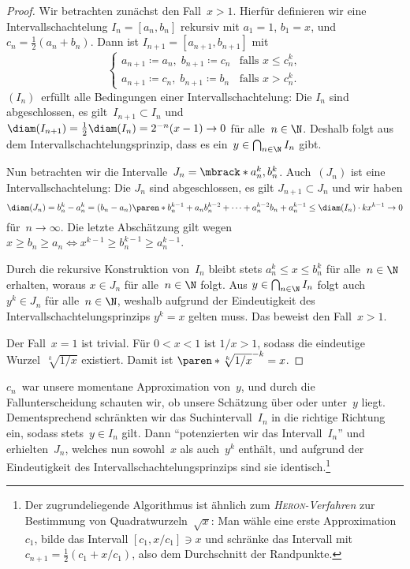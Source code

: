 \documentclass[a4paper]{article}
\begin{document}
\begin{proof}
    Wir betrachten zunächst den Fall~$x > 1$. Hierfür definieren wir eine Intervallschachtelung $I_n = [a_n, b_n]$ rekursiv mit $a_1 = 1$, $b_1 = x$, und $c_n = \frac{1}{2}(a_n + b_n)$. Dann ist $I_{n+1} = [a_{n+1}, b_{n+1}]$ mit
    \begin{equation*}
        \begin{cases}
            a_{n+1} \coloneqq a_n,\; b_{n+1} \coloneqq c_n & \text{falls } x \leq c_n^k, \\
            a_{n+1} \coloneqq c_n,\; b_{n+1} \coloneqq b_n & \text{falls } x > c_n^k.
        \end{cases}
    \end{equation*}
    $(I_n)$~erfüllt alle Bedingungen einer Intervallschachtelung: Die $I_n$ sind abgeschlossen, es gilt~$I_{n+1} \subset I_n$ und $\diam(I_{n+1}) = \frac{1}{2} \diam(I_n) = 2^{-n} (x-1) \to 0$ für alle~$n \in \N$. Deshalb folgt aus dem Intervallschachtelungsprinzip, dass es ein~$y \in \bigcap_{n\in\N} I_n$ gibt.

    Nun betrachten wir die Intervalle~$J_n = \mbrack*{a_n^k, b_n^k}$. Auch~$(J_n)$ ist eine Intervallschachtelung: Die $J_n$ sind abgeschlossen, es gilt $J_{n+1} \subset J_n$ und wir haben
    \begin{equation*}
        \diam(J_n) = b_n^k - a_n^k = (b_n - a_n) \paren*{b_n^{k-1} + a_n b_n^{k-2} + \dots + a_n^{k-2} b_n + a_n^{k-1}} \leq \diam(I_n) \cdot k x^{k-1} \to 0
    \end{equation*}
    für~$n \to \infty$. Die letzte Abschätzung gilt wegen $x \geq b_n \geq a_n \iff x^{k-1} \geq b_n^{k-1} \geq a_n^{k-1}$.

    Durch die rekursive Konstruktion von~$I_n$ bleibt stets $a_n^k \leq x \leq b_n^k$ für alle~$n \in \N$ erhalten, woraus $x \in J_n$ für alle~$n \in \N$ folgt. Aus $y \in \bigcap_{n\in\N} I_n$ folgt auch $y^k \in J_n$ für alle~$n \in \N$, weshalb aufgrund der Eindeutigkeit des Intervallschachtelungsprinzips $y^k = x$ gelten muss. Das beweist den Fall~$x > 1$.

    Der Fall~$x = 1$ ist trivial. Für $0 < x < 1$ ist $1/x > 1$, sodass die eindeutige Wurzel~$\sqrt[k]{1/x}$ existiert. Damit ist $\paren*{\sqrt[k]{1/x}}^{-k} = x$.
\end{proof}

$c_n$~war unsere momentane Approximation von~$y$, und durch die Fallunterscheidung schauten wir, ob unsere Schätzung über oder unter~$y$ liegt. Dementsprechend schränkten wir das Suchintervall~$I_n$ in die richtige Richtung ein, sodass stets~$y \in I_n$ gilt. Dann "`potenzierten wir das Intervall~$I_n$"' und erhielten~$J_n$, welches nun sowohl~$x$ als auch~$y^k$ enthält, und aufgrund der Eindeutigkeit des Intervallschachtelungsprinzips sind sie identisch.\footnote{Der zugrundeliegende Algorithmus ist ähnlich zum \emph{\textsc{Heron}-Verfahren} zur Bestimmung von Quadratwurzeln~$\sqrt{x}$: Man wähle eine erste Approximation~$c_1$, bilde das Intervall $[c_1, x/c_1] \ni x$ und schränke das Intervall mit $c_{n+1} = \frac{1}{2} (c_1 + x/c_1)$, also dem Durchschnitt der Randpunkte.}
\end{document}
